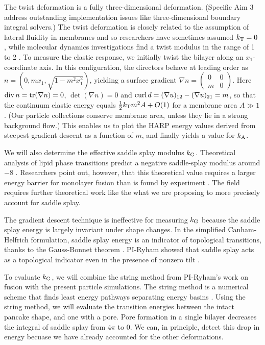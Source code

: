 The twist deformation is a fully three-dimensional deformation. 
(Specific Aim 3 address outstanding implementation issues like three-dimensional boundary integral solvers.) 
The twist deformation is closely related to the assumption of lateral fluidity in membranes and so researchers 
have sometimes assumed $k_{\mathrm{T}} = 0$ \cite{HaKo2000, 10.1063/1.4990404, https://doi.org/10.1039/C9SM02079A, 10.1103/PhysRevE.102.042406}, 
while molecular dynamics investigations find a twist modulus in the range of 1 to 2 \kBT \cite{LeVeWa14}.
To measure the elastic response,  we initially twist the bilayer along an $x_1$-coordinate axis.
In this configuration, the directors behave at leading order as $n = (0, mx_1, \sqrt{1 - m^2x_1^2})$,
yielding a surface gradient $\nabla n = \begin{pmatrix}0 & 0\\ m & 0\end{pmatrix}$. 
Here $\operatorname{div} n = \mathrm{tr}(\nabla n) = 0$, $\det(\nabla n) = 0$ and $\operatorname{curl} d = (\nabla u)_{12} - (\nabla u)_{21} = m$,
so that the continuum elastic energy equals $\tfrac{1}{2}k_{\mathrm{T}} m^2 A + O(1)$ for a membrane area $A \gg 1$. (Our particle collections
conserve membrane area, unless they lie in a strong background flow.) 
This enables us to plot the HARP energy values derived from steepest gradient descent as a function of $m$, and finally
yields a value for $k_{\mathrm{A}}$. 

We will also determine the effective saddle splay modulus $k_{\mathrm{G}}$. 
Theoretical analysis of lipid phase transitions predict a negative saddle-splay modulus around $-8$ \kBT\;
\cite{SIEGEL2004366,SIEGEL20085200}. Researchers point out, however, that this theoretical value requires a larger energy 
barrier for monolayer fusion than is found by experiment \cite{FrRoPi17,Tran7106,TerziDeserno17}. 
The field requires further theoretical work like the what we are proposing to more precisely account for saddle splay.
  
The gradient descent technique is ineffective for measuring $k_{\mathrm{G}}$ because
the saddle splay energy is largely invariant under shape changes.
In the simplified Canham-Helfrich formulation, saddle splay energy is an indicator of topological transitions, thanks to the  Gauss-Bonnet theorem
\cite{TerziDeserno17}.
PI-Ryham showed that saddle splay acts as a topological indicator even in the presence of nonzero tilt \cite{RyKlYaCo16}. 

To evaluate $k_{\mathrm{G}}$, we will combine the string method from PI-Ryham's work on fusion \cite{RyKlYaCo16} with
the present particle simulations. The string method is a numerical scheme that finds
least energy pathways separating energy basins \cite{simple_string}.
Using the string method, we will evaluate the transition energies between the intact pancake shape,
and one with a pore. Pore formation in a single bilayer decreases the integral of saddle splay from $4\pi$
to $0$. We can, in principle, detect this drop in energy becuase we have already accounted for the other deformations. 


